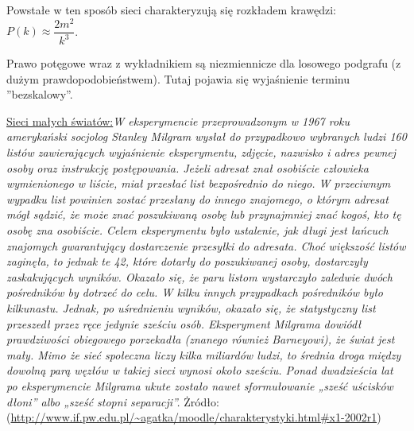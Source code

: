 Powstałe w ten sposób sieci charakteryzują się rozkładem krawędzi:\newline 
$ P(k) \approx \dfrac{2m^2}{k^3} $.

Prawo potęgowe wraz z wykładnikiem są niezmiennicze dla losowego podgrafu (z dużym prawdopodobieństwem). Tutaj pojawia się wyjaśnienie terminu ”bezskalowy”.

\underline{Sieci małych światów:}\newline \textit{W eksperymencie przeprowadzonym w 1967 roku amerykański socjolog Stanley Milgram wysłał do przypadkowo wybranych ludzi 160 listów zawierających wyjaśnienie eksperymentu, zdjęcie, nazwisko i adres pewnej osoby oraz instrukcję postępowania. Jeżeli adresat znał osobiście człowieka wymienionego w liście, miał przesłać list bezpośrednio do niego. W przeciwnym wypadku list powinien zostać przesłany do innego znajomego, o którym adresat mógł sądzić, że może znać poszukiwaną osobę lub przynajmniej znać kogoś, kto tę osobę zna osobiście. Celem eksperymentu było ustalenie, jak długi jest łańcuch znajomych gwarantujący dostarczenie przesyłki do adresata.  Choć większość listów zaginęła, to jednak te 42, które dotarły do poszukiwanej osoby, dostarczyły zaskakujących wyników. Okazało się, że paru listom wystarczyło zaledwie dwóch pośredników by dotrzeć do celu. W kilku innych przypadkach pośredników było kilkunastu. Jednak, po uśrednieniu wyników, okazało się, że statystyczny list przeszedł przez ręce jedynie sześciu osób. Eksperyment Milgrama dowiódł prawdziwości obiegowego porzekadła (znanego również Barneyowi), że świat jest mały. Mimo że sieć społeczna liczy kilka miliardów ludzi, to średnia droga między dowolną parą węzłów w takiej sieci wynosi około sześciu. Ponad dwadzieścia lat po eksperymencie Milgrama ukute zostało nawet sformułowanie „sześć uścisków dłoni” albo „sześć stopni separacji”. } Żródło: \newline (\url{http://www.if.pw.edu.pl/~agatka/moodle/charakterystyki.html#x1-2002r1})